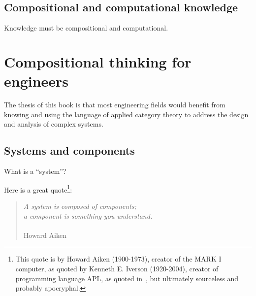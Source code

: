 %
%

\subsection{Compositional and computational knowledge}

Knowledge must be compositional and computational.

\section[Compositionality for engineers]{Compositional thinking for engineers}
\label{sec:compositionality-for-engineers}

The thesis of this book is that most engineering fields would benefit from knowing and using the language of applied category theory to address the design and analysis of complex systems.

\subsection{Systems and components}

\label{subsec:introduction-systems-and-components}

What is a ``system''?

Here is a great quote\footnote{
    This quote is by Howard Aiken (1900-1973), creator of the MARK I computer,
    as quoted by Kenneth E.
    Iverson (1920-2004), creator of programming language APL,
    as quoted in~\cite{McIntyre1999Role}, but ultimately sourceless and probably apocryphal.
}:

\begin{quote}
    \emph{A system is composed of components; \\
        a component is something you understand.}\\ \\
    Howard Aiken
\end{quote}

